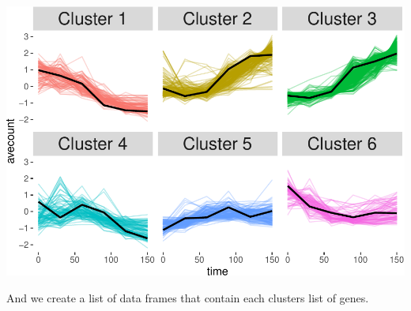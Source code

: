 \documentclass[]{article}
\begin{document}
\includegraphics{EcoliTechnicalReport_files/figure-latex/plot clusters-1.pdf}

And we create a list of data frames that contain each clusters list of
genes.
\end{document}
